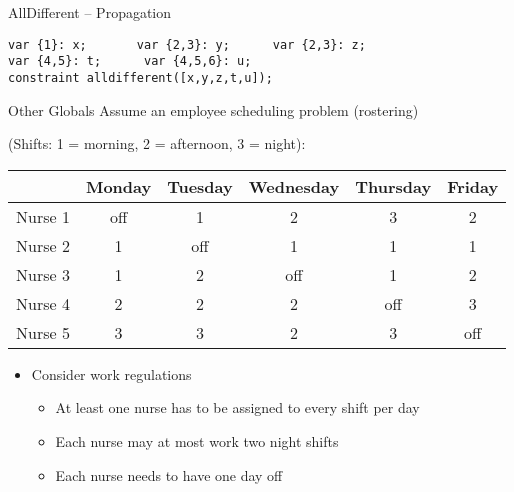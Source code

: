 \begin{frame}[fragile]{AllDifferent -- Propagation}
\begin{center}
\end{center}
\vspace*{-15ex}
\begin{lstlisting}
var {1}: x;       var {2,3}: y;      var {2,3}: z;
var {4,5}: t;      var {4,5,6}: u;
constraint alldifferent([x,y,z,t,u]);
\end{lstlisting}
\end{frame}

\begin{frame}{Other Globals}
Assume an employee scheduling problem (rostering) 

(Shifts: 1 = morning, 2 = afternoon, 3 = night):

\begin{center}
\begin{tabular}{|c|c|c|c|c|c|}
\hline 
 & Monday & Tuesday & Wednesday & Thursday & Friday \\ 
\hline 
Nurse 1 & off & 1 & \alert<2->{2} & 3 & 2 \\ 
Nurse 2 & 1 & off & \alert<2->{1} & 1 & 1 \\ 
Nurse 3 & 1 & 2 & off & 1 & 2 \\ 
Nurse 4 & 2 & 2 & \alert<2->{2} & off & 3 \\ 
Nurse 5 & \alert<3->{3} & \alert<3->{3} & \alert<2->{2} & \alert<3->{3} & off \\ 
\hline 
\end{tabular} 
\end{center}
\pause 
\begin{itemize}
\item Consider work regulations
\begin{itemize} \pause 
\item At least one nurse has to be assigned to every shift per day \pause 
\item Each nurse may at most work two night shifts
\item Each nurse needs to have one day off 
\end{itemize}
\end{itemize}

\end{frame}

